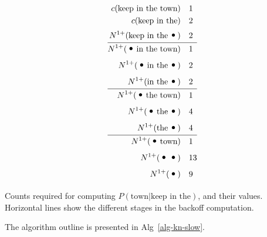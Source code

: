 \begin{table}
\begin{align*}
c(\text{keep in the town})  & \quad 1 \\
c(\text{keep in the}) & \quad 2 \\
\nlplus{\text{keep in the} \Bigcdot} & \quad 2 \\ \hline
\nlplus{\Bigcdot \text{in the town}} & \quad 1\\
\nlplus{\Bigcdot \text{in the} \Bigcdot} & \quad 2 \\
\nlplus{\text{in the} \Bigcdot} & \quad 2 \\ \hline
\nlplus{\Bigcdot \text{the town}} & \quad 1\\
\nlplus{\Bigcdot \text{the} \Bigcdot} & \quad 4 \\
\nlplus{\text{the} \Bigcdot} & \quad 4  \\ \hline
\nlplus{\Bigcdot \text{town}} & \quad 1 \\
\nlplus{\Bigcdot \Bigcdot} & \quad 13 \\ %
\nlplus{\Bigcdot} & \quad 9  %
\end{align*}
\caption{Counts required for computing $P(\text{town} | \text{keep in
    the})$, and their values. Horizontal lines show the different
  stages in the backoff computation.}
\label{tab-counts-example}
\end{table}

The algorithm outline is presented in
Alg~\ref{alg-kn-slow}. 

